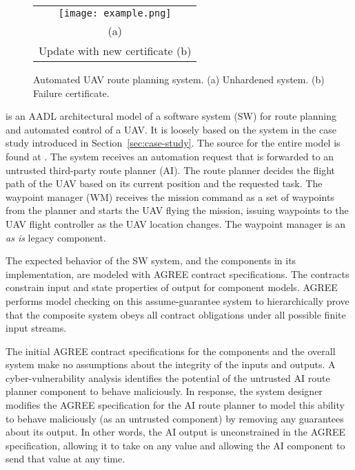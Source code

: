 \begin{figure*}
  \begin{center}
    \begin{tabular}{c}
      \texttt{[image: example.png]} \\
      (a) \\
      Update with new certificate
      (b)
    \end{tabular}
  \end{center}
\caption{Automated UAV route planning system. (a) Unhardened system. (b) Failure certificate.}
\label{fig:example}
\end{figure*}

 is an AADL architectural model of a software system (SW) for route planning and automated control of a UAV.
It is loosely based on the system in the case study introduced in Section~\ref{sec:case-study}.
The source for the entire model is found at \cite{repo}.
The system receives an automation request that is forwarded to an untrusted third-party route planner (AI).
The route planner decides the flight path of the UAV based on its current position and the requested task.
The waypoint manager (WM) receives the mission command as a set of waypoints from the planner and starts the UAV flying the mission, issuing waypoints to the UAV flight controller as the UAV location changes.
The waypoint manager is an \emph{as is} legacy component.

The expected behavior of the SW system, and the components in its implementation, are modeled with AGREE contract specifications.
The contracts constrain input and state properties of output for component models.
AGREE performs model checking on this assume-guarantee system to hierarchically prove that the composite system obeys all contract obligations under all possible finite input streams. 

The initial AGREE contract specifications for the components and the overall system make no assumptions about the integrity of the inputs and outputs.
A cyber-vulnerability analysis identifies the potential of the untrusted AI route planner component to behave maliciously.
In response, the system designer modifies the AGREE specification for the AI route planner to model this ability to behave maliciously (as an untrusted component) by removing any guarantees about its output.
In other words, the AI output is unconstrained in the AGREE specification, allowing it to take on any value and allowing the AI component to send that value at any time.

